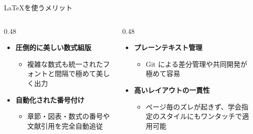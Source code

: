 \documentclass[aspectratio=169,11pt]{beamer}
\DeclareRobustCommand{\LaTeX}{LaTeX}
\begin{document}
\begin{frame}{\LaTeX を使うメリット}
  \begin{columns}[T]
    \begin{column}{0.48\textwidth}
      \begin{itemize}
        \item \textbf{圧倒的に美しい数式組版}
          \begin{itemize}
            \item 複雑な数式も統一されたフォントと間隔で極めて美しく出力
          \end{itemize}
        \item \textbf{自動化された番号付け}
          \begin{itemize}
            \item 章節・図表・数式の番号や文献引用を完全自動追従
          \end{itemize}
      \end{itemize}
    \end{column}
    \begin{column}{0.48\textwidth}
      \begin{itemize}
        \item \textbf{プレーンテキスト管理}
          \begin{itemize}
            \item Git による差分管理や共同開発が極めて容易
          \end{itemize}
        \item \textbf{高いレイアウトの一貫性}
          \begin{itemize}
            \item ページ毎のズレが起きず、学会指定のスタイルにもワンタッチで適用可能
          \end{itemize}
      \end{itemize}
    \end{column}
  \end{columns}
\end{frame}
\end{document}

